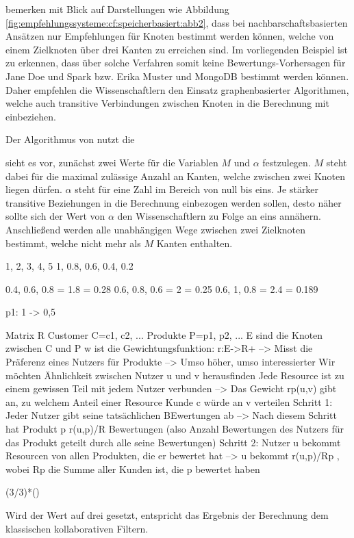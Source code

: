 \textcite[S. 7ff.]{huang:2004} bemerken mit Blick auf Darstellungen wie Abbildung \ref{fig:empfehlungssysteme:cf:speicherbasiert:abb2}, dass bei nachbarschaftsbasierten Ansätzen nur Empfehlungen für Knoten bestimmt werden können, welche von einem Zielknoten über drei Kanten zu erreichen sind. Im vorliegenden Beispiel ist zu erkennen, dass über solche Verfahren somit keine Bewertungs-Vorhersagen für Jane Doe und Spark bzw. Erika Muster und MongoDB bestimmt werden können. Daher empfehlen die Wissenschaftlern den Einsatz graphenbasierter Algorithmen, welche auch transitive Verbindungen zwischen Knoten in die Berechnung mit einbeziehen.


Der Algorithmus von \textcite[S. 7ff.]{huang:2004} nutzt die 


sieht es vor, zunächst zwei Werte für die Variablen $M$ und $\alpha$ festzulegen. $M$ steht dabei für die maximal zulässige Anzahl an Kanten, welche zwischen zwei Knoten liegen dürfen. $\alpha$ steht für eine Zahl im Bereich von null bis eins. Je stärker transitive Beziehungen in die Berechnung einbezogen werden sollen, desto näher sollte sich der Wert von $\alpha$ den Wissenschaftlern zu Folge an eins annähern. Anschließend werden alle unabhängigen Wege zwischen zwei Zielknoten bestimmt, welche nicht mehr als $M$ Kanten enthalten.

1,   2,   3,   4,   5
1, 0.8, 0.6, 0.4, 0.2

0.4, 0.6, 0.8 = 1.8 = 0.28
0.6, 0.8, 0.6 = 2   = 0.25
0.6, 1, 0.8   = 2.4 = 0.189

p1: 1 -> 0,5

Matrix R
Customer C={c1, c2, ...}
Produkte P={p1, p2, ...}
E sind die Knoten zwischen C und P
w ist die Gewichtungsfunktion: r:E->R+ --> Misst die Präferenz eines Nutzers für Produkte --> Umso höher, umso interessierter
Wir möchten Ähnlichkeit zwischen Nutzer u und v herausfinden
Jede Resource ist zu einem gewissen Teil mit jedem Nutzer verbunden --> Das Gewicht rp(u,v) gibt an, zu welchem Anteil einer Resource Kunde c würde an v verteilen
Schritt 1: Jeder Nutzer gibt seine tatsächlichen BEwertungen ab --> Nach diesem Schritt hat Produkt p r(u,p)/R Bewertungen (also Anzahl Bewertungen des Nutzers für das Produkt geteilt durch alle seine Bewertungen)
Schritt 2: Nutzer u bekommt Resourcen von allen Produkten, die er bewertet hat --> u bekommt r(u,p)/Rp , wobei Rp die Summe aller Kunden ist, die p bewertet haben

(3/3)*()


Wird der Wert auf drei gesetzt, entspricht das Ergebnis der Berechnung dem klassischen kollaborativen Filtern. 

